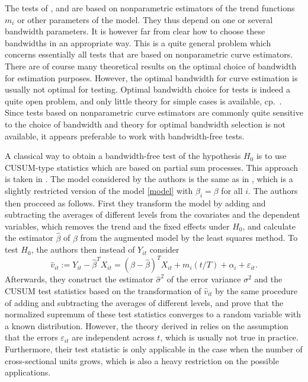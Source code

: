 \documentclass[a4paper,12pt]{article}
\begin{document}
The tests of \cite{Zhang2012}, \cite{DegrasWu2012} and \cite{ChenWu2018} are based on nonparametric estimators of the trend functions $m_i$ or other parameters of the model. They thus depend on one or several bandwidth parameters. It is however far from clear how to choose these bandwidths in an appropriate way. This is a quite general problem which concerns essentially all tests that are based on nonparametric curve estimators. There are of course many theoretical results on the optimal choice of bandwidth for estimation purposes. However, the optimal bandwidth for curve estimation is usually not optimal for testing. Optimal bandwidth choice for tests is indeed a quite open problem, and only little theory for simple cases is available, cp.\ \cite{GaoGijbels2008}. Since tests based on nonparametric curve estimators are commonly quite sensitive to the choice of bandwidth and theory for optimal bandwidth selection is not available, it appears preferable to work with bandwidth-free tests. 


A classical way to obtain a bandwidth-free test of the hypothesis $H_0$ is to use CUSUM-type statistics which are based on partial sum processes. This approach is taken in \cite{Hidalgo2014}. The model considered by the authors is the same as in \cite{Zhang2012}, which is a slightly restricted version of the model \eqref{model} with $\beta_i = \beta$ for all $i$. The authors then procceed as follows. First they transform the model by adding and subtracting the averages of different levels from the covariates and the dependent variables, which removes the trend and the fixed effects under $H_0$, and calculate the estimator $\widehat{\beta}$ of $\beta$ from the augmented model by the least squares method. To test $H_0$, the authors then instead of $Y_{it}$ consider
\[\widehat{v}_{it}:= Y_{it} - \widehat{\beta}^T X_{it} = (\beta - \widehat{\beta})^T X_{it} + m_i(t/T) + \alpha_i + \varepsilon_{it}.\]
Afterwards, they construct the estimator $\widehat{\sigma}^2$ of the error variance $\sigma^2$ and the CUSUM test statistics based on the transformation of $\widehat{v}_{it}$ by the same procedure of adding and subtracting the averages of different levels, and prove that the normalized supremum of these test statistics converges to a random variable with a known distribution. However, the theory derived in \cite{Hidalgo2014} relies on the assumption that the errors $\varepsilon_{it}$ are independent across $t$, which is usually not true in practice. Furthermore, their test statistic is only applicable in the case when the number of cross-sectional units grows, which is also a heavy restriction on the possible applications.
\end{document}
